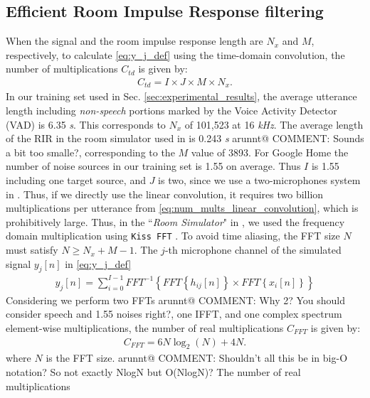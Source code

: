 \documentclass{article}
\makeatletter
\newcommand{\AR}[1]{{\color{red} arunnt@ COMMENT: #1}}
\makeatother
\begin{document}
%
%
%
\subsection{Efficient Room Impulse Response filtering}
%
%
%
When the signal and the room impulse response length are $N_x$ and
$M$, respectively, to calculate \eqref{eq:y_j_def} using the time-domain
convolution, the number of multiplications $C_{td}$ is given by:
\begin{align}
  C_{td} = I \times J \times  M  \times N_x.
  \label{eq:num_mults_linear_convolution}
\end{align}
In our training set used in Sec. \ref{sec:experimental_results},
the average utterance length including \emph{non-speech} portions
marked by the Voice Activity Detector (VAD) is 6.35 \textit{s}.
This corresponds to $N_x$ of 101,523 at 16 \textit{kHz}. The average
length of the RIR in the room simulator used in
\cite{C_Kim_INTERSPEECH_2017_1} is 0.243 \textit{s} \AR{Sounds a bit too smalle?}, corresponding
to the $M$ value of 3893.
For Google Home the number of noise sources in our training
set is 1.55 on average.
Thus $I$ is 1.55 including one target source, and $J$ is two, since
we use a two-microphones system in
\cite{C_Kim_INTERSPEECH_2017_1, B_Li_INTERSPEECH_2017_1}.
Thus, if we directly use the linear convolution, it requires
two billion multiplications per utterance from
\eqref{eq:num_mults_linear_convolution}, which is prohibitively large.
Thus, in the ``\textit{Room Simulator}" in
\cite{C_Kim_INTERSPEECH_2017_1},
we used the frequency domain multiplication using \texttt{Kiss FFT}
\cite{M_Borgerding_kiss_fft_2010}. To avoid time aliasing,
the FFT size $N$ must satisfy $N \ge N_x + M - 1$.
The $j$-th microphone channel
of the simulated signal $y_j[n]$ in \eqref{eq:y_j_def}
\begin{align}
  y_{j} [n] = \sum_{i=0}^{I-1}FFT^{-1} \left \{
      FFT \left \{ h_{ij}[n] \right \} \times
      FFT \left \{ x_i[n] \right \}
      \right \}  %
\end{align}
Considering we perform two FFTs \AR{Why 2? You should consider speech and 1.55 noises right?}, one IFFT, and one complex spectrum
element-wise multiplications, the number of real multiplications
$C_{\textit{FFT}}$ is given by:
\begin{align}
  C_{\textit{FFT}} = 6 N \log_2(N) + 4 N.
  \label{eq:c_fft}
\end{align}
where $N$ is the FFT size. \AR{Shouldn't all this be in big-O notation? So not exactly NlogN but O(NlogN)?} The number of real multiplications
\end{document}
